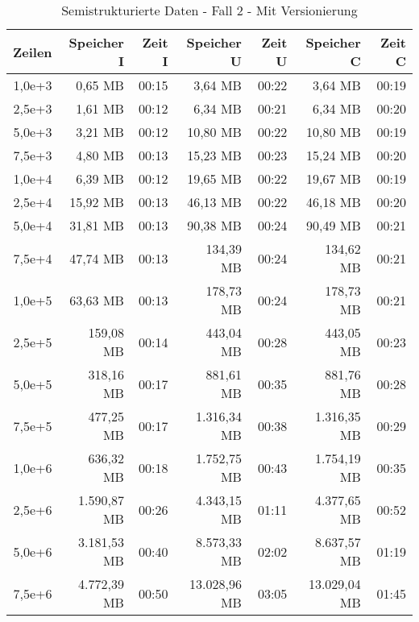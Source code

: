 \begin{table}
    \centering
    \begin{tabular}{|r|r|r|r|r|r|r|}
        \hline
        \textbf{Zeilen} & \textbf{Speicher I} & \textbf{Zeit I} & \textbf{Speicher U} & \textbf{Zeit U} & \textbf{Speicher C} & \textbf{Zeit C} \\ \hline
        1,0e+3  & 0,65 MB       & 00:15 & 3,64 MB       & 00:22 & 3,64 MB       & 00:19 \\ \hline
        2,5e+3  & 1,61 MB       & 00:12 & 6,34 MB       & 00:21 & 6,34 MB       & 00:20 \\ \hline
        5,0e+3  & 3,21 MB       & 00:12 & 10,80 MB      & 00:22 & 10,80 MB      & 00:19 \\ \hline
        7,5e+3  & 4,80 MB       & 00:13 & 15,23 MB      & 00:23 & 15,24 MB      & 00:20 \\ \hline
        1,0e+4  & 6,39 MB       & 00:12 & 19,65 MB      & 00:22 & 19,67 MB      & 00:19 \\ \hline
        2,5e+4  & 15,92 MB      & 00:13 & 46,13 MB      & 00:22 & 46,18 MB      & 00:20 \\ \hline
        5,0e+4  & 31,81 MB      & 00:13 & 90,38 MB      & 00:24 & 90,49 MB      & 00:21 \\ \hline
        7,5e+4  & 47,74 MB      & 00:13 & 134,39 MB     & 00:24 & 134,62 MB     & 00:21 \\ \hline
        1,0e+5  & 63,63 MB      & 00:13 & 178,73 MB     & 00:24 & 178,73 MB     & 00:21 \\ \hline
        2,5e+5  & 159,08 MB     & 00:14 & 443,04 MB     & 00:28 & 443,05 MB     & 00:23 \\ \hline
        5,0e+5  & 318,16 MB     & 00:17 & 881,61 MB     & 00:35 & 881,76 MB     & 00:28 \\ \hline
        7,5e+5  & 477,25 MB     & 00:17 & 1.316,34 MB   & 00:38 & 1.316,35 MB   & 00:29 \\ \hline
        1,0e+6  & 636,32 MB     & 00:18 & 1.752,75 MB   & 00:43 & 1.754,19 MB   & 00:35 \\ \hline
        2,5e+6  & 1.590,87 MB   & 00:26 & 4.343,15 MB   & 01:11 & 4.377,65 MB   & 00:52 \\ \hline
        5,0e+6  & 3.181,53 MB   & 00:40 & 8.573,33 MB   & 02:02 & 8.637,57 MB   & 01:19 \\ \hline
        7,5e+6  & 4.772,39 MB   & 00:50 & 13.028,96 MB  & 03:05 & 13.029,04 MB  & 01:45 \\ \hline
    \end{tabular}
    \caption{Semistrukturierte Daten - Fall 2 - Mit Versionierung}
\end{table}















